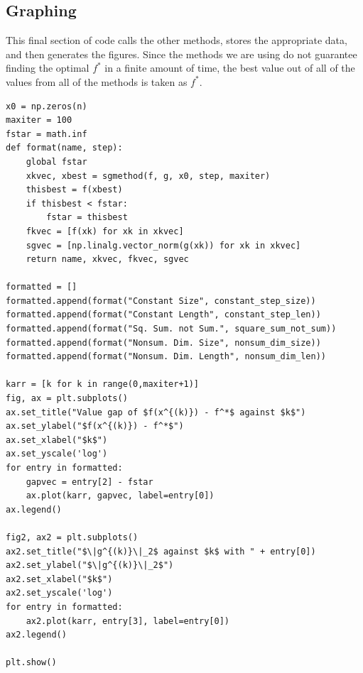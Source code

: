 \documentclass[journal,onecolumn]{IEEEtran}
\begin{document}
\subsection{Graphing}
This final section of code calls the other methods, stores the appropriate data, and then generates the figures. Since the methods we are using do not guarantee finding the optimal \(f^*\) in a finite amount of time, the best value out of all of the values from all of the methods is taken as \(f^*\).
\begin{verbatim}
x0 = np.zeros(n)
maxiter = 100
fstar = math.inf
def format(name, step):
    global fstar
    xkvec, xbest = sgmethod(f, g, x0, step, maxiter)
    thisbest = f(xbest)
    if thisbest < fstar:
        fstar = thisbest
    fkvec = [f(xk) for xk in xkvec]
    sgvec = [np.linalg.vector_norm(g(xk)) for xk in xkvec]
    return name, xkvec, fkvec, sgvec

formatted = []
formatted.append(format("Constant Size", constant_step_size))
formatted.append(format("Constant Length", constant_step_len))
formatted.append(format("Sq. Sum. not Sum.", square_sum_not_sum))
formatted.append(format("Nonsum. Dim. Size", nonsum_dim_size))
formatted.append(format("Nonsum. Dim. Length", nonsum_dim_len))

karr = [k for k in range(0,maxiter+1)]
fig, ax = plt.subplots()
ax.set_title("Value gap of $f(x^{(k)}) - f^*$ against $k$")
ax.set_ylabel("$f(x^{(k)}) - f^*$")
ax.set_xlabel("$k$")
ax.set_yscale('log')
for entry in formatted:
    gapvec = entry[2] - fstar
    ax.plot(karr, gapvec, label=entry[0])
ax.legend()

fig2, ax2 = plt.subplots()
ax2.set_title("$\|g^{(k)}\|_2$ against $k$ with " + entry[0])
ax2.set_ylabel("$\|g^{(k)}\|_2$")
ax2.set_xlabel("$k$")
ax2.set_yscale('log')
for entry in formatted:
    ax2.plot(karr, entry[3], label=entry[0])
ax2.legend()

plt.show()
\end{verbatim}
\end{document}
